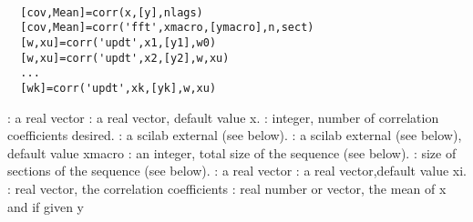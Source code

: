 \begin{mandesc}
   \\ %
\end{mandesc}
\begin{calling_sequence}
\begin{verbatim}
  [cov,Mean]=corr(x,[y],nlags)  
  [cov,Mean]=corr('fft',xmacro,[ymacro],n,sect)  
  [w,xu]=corr('updt',x1,[y1],w0)  
  [w,xu]=corr('updt',x2,[y2],w,xu)  
  ...  
  [wk]=corr('updt',xk,[yk],w,xu)  
\end{verbatim}
\end{calling_sequence}
\begin{parameters}
  \begin{varlist}
    : a real vector
    : a real vector, default value x.
    : integer, number of correlation coefficients desired.
    : a scilab external (see below).
    : a scilab external (see below), default value xmacro
    : an integer, total size of the sequence (see below).
    : size of sections of the sequence (see below).
    : a real vector
    : a real vector,default value xi.
    : real vector, the correlation coefficients
    : real number or vector,  the mean of x and if given y
  \end{varlist}
\end{parameters}
